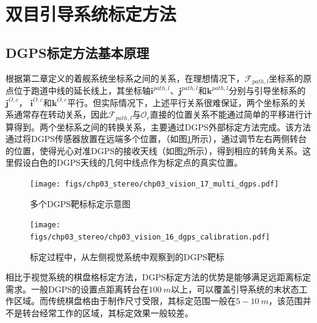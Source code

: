 \section{双目引导系统标定方法}
\subsection{DGPS标定方法基本原理}
根据第二章定义的着舰系统坐标系之间的关系，在理想情况下，$\mathcal{F}_{path,l}$坐标系的原点位于跑道中线的延长线上，其坐标轴$\mathbf{i}^{path,l}$、$\mathbf{j}^{path,l}$和$\mathbf{k}^{path,l}$分别与引导坐标系的$\mathbf{j}^{O,c}$， $\mathbf{i}^{O,c}$和$\mathbf{k}^{O,c}$平行。但实际情况下，上述平行关系很难保证，两个坐标系的关系通常存在转动关系，因此$\mathcal{F}_{path,l}$与$\mathcal{O}_c$直接的位置关系不能通过简单的平移进行计算得到。两个坐标系之间的转换关系，主要通过DGPS外部标定方法完成\cite{liao2009automatic}。该方法通过将DGPS传感器放置在远端多个位置，（如图\ref{fig:chp03_vision_17_multi_dgps}所示），通过调节左右两侧转台的位置，使得光心对准DGPS的接收天线（如图\ref{fig:chp03_vision_16_dgps_calibration}所示），得到相应的转角关系。这里假设白色的DGPS天线的几何中线点作为标定点的真实位置。

\begin{figure}[!th]
	\centering
	\texttt{[image: figs/chp03\_stereo/chp03\_vision\_17\_multi\_dgps.pdf]}	
	\caption{多个DGPS靶标标定示意图}
	\label{fig:chp03_vision_17_multi_dgps}
\end{figure}


\begin{figure}[htb]
	\centering
	\texttt{[image: figs/chp03\_stereo/chp03\_vision\_16\_dgps\_calibration.pdf]}	
	\caption{标定过程中，从左侧视觉系统中观察到的DGPS靶标}
	\label{fig:chp03_vision_16_dgps_calibration}
\end{figure}


相比于视觉系统的棋盘格标定方法，DGPS标定方法的优势是能够满足远距离标定需求。一般DGPS的设置点距离转台在$100\ m$以上，可以覆盖引导系统的末状态工作区域。而传统棋盘格由于制作尺寸受限，其标定范围一般在$5-10\ m$，该范围并不是转台经常工作的区域，其标定效果一般较差。

